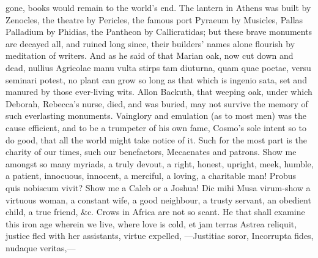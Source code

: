 {gone, books would remain to the world's end. The lantern in
Athens was built by Zenocles, the theatre by Pericles, the famous
port Pyraeum by Musicles, Pallas Palladium by Phidias, the Pantheon by
Callicratidas; but these brave monuments are decayed all, and ruined
long since, their builders' names alone flourish by meditation of
writers. And as he said of that Marian oak, now cut down and
dead, nullius Agricolae manu vulta stirps tam diuturna, quam quae
poetae, versu seminari potest, no plant can grow so long as that which
is ingenio sata, set and manured by those ever-living wits. Allon
Backuth, that weeping oak, under which Deborah, Rebecca's nurse, died,
and was buried, may not survive the memory of such everlasting
monuments. Vainglory and emulation (as to most men) was the cause
efficient, and to be a trumpeter of his own fame, Cosmo's sole intent
so to do good, that all the world might take notice of it. Such for the
most part is the charity of our times, such our benefactors, Mecaenates
and patrons. Show me amongst so many myriads, a truly devout, a right,
honest, upright, meek, humble, a patient, innocuous, innocent, a
merciful, a loving, a charitable man! Probus quis nobiscum vivit?
Show me a Caleb or a Joshua! Dic mihi Musa virum-show a virtuous woman,
a constant wife, a good neighbour, a trusty servant, an obedient child,
a true friend, \&c. Crows in Africa are not so scant. He that shall
examine this iron age wherein we live, where love is cold, et jam
terras Astrea reliquit, justice fled with her assistants, virtue
expelled,
---Justitiae soror,
Incorrupta fides, nudaque veritas,---

}
